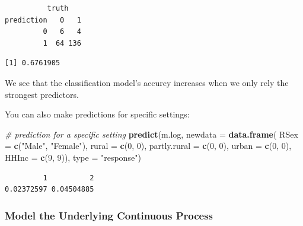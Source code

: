 \documentclass[]{article}
\newenvironment{Shaded}{\begin{snugshade}}{\end{snugshade}}
\newcommand{\CommentTok}[1]{\textcolor[rgb]{0.56,0.35,0.01}{\textit{#1}}}
\newcommand{\DataTypeTok}[1]{\textcolor[rgb]{0.13,0.29,0.53}{#1}}
\newcommand{\DecValTok}[1]{\textcolor[rgb]{0.00,0.00,0.81}{#1}}
\newcommand{\KeywordTok}[1]{\textcolor[rgb]{0.13,0.29,0.53}{\textbf{#1}}}
\newcommand{\NormalTok}[1]{#1}
\newcommand{\OperatorTok}[1]{\textcolor[rgb]{0.81,0.36,0.00}{\textbf{#1}}}
\newcommand{\StringTok}[1]{\textcolor[rgb]{0.31,0.60,0.02}{#1}}
\begin{document}
\begin{verbatim}
          truth
prediction   0   1
         0   6   4
         1  64 136
\end{verbatim}

\begin{Shaded}
\end{Shaded}

\begin{verbatim}
[1] 0.6761905
\end{verbatim}

We see that the classification model's accurcy increases when we only rely the strongest predictors.

You can also make predictions for specific settings:

\begin{Shaded}
\begin{Highlighting}[]
\CommentTok{# prediction for a specific setting}
\KeywordTok{predict}\NormalTok{(m.log, }\DataTypeTok{newdata =} \KeywordTok{data.frame}\NormalTok{( }\DataTypeTok{RSex =} \KeywordTok{c}\NormalTok{(}\StringTok{"Male"}\NormalTok{, }\StringTok{"Female"}\NormalTok{),}
                                     \DataTypeTok{rural =} \KeywordTok{c}\NormalTok{(}\DecValTok{0}\NormalTok{, }\DecValTok{0}\NormalTok{),}
                                     \DataTypeTok{partly.rural =} \KeywordTok{c}\NormalTok{(}\DecValTok{0}\NormalTok{, }\DecValTok{0}\NormalTok{),}
                                     \DataTypeTok{urban =} \KeywordTok{c}\NormalTok{(}\DecValTok{0}\NormalTok{, }\DecValTok{0}\NormalTok{),}
                                     \DataTypeTok{HHInc =} \KeywordTok{c}\NormalTok{(}\DecValTok{9}\NormalTok{, }\DecValTok{9}\NormalTok{)), }\DataTypeTok{type =} \StringTok{"response"}\NormalTok{)}
\end{Highlighting}
\end{Shaded}

\begin{verbatim}
         1          2 
0.02372597 0.04504885 
\end{verbatim}

\hypertarget{model-the-underlying-continuous-process}{%
\subsubsection{Model the Underlying Continuous Process}\label{model-the-underlying-continuous-process}}
\end{document}
